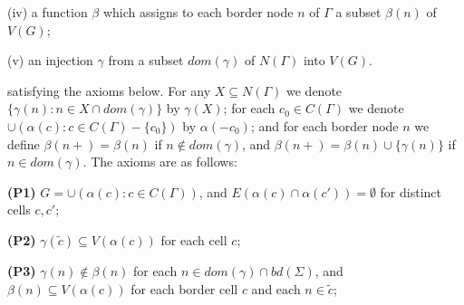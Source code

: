 \hspace*{12pt}(iv) a function $\beta$ which assigns to each border node $n$ of $\Gamma$ a subset $\beta(n)$ of $V(G)$;

\hspace*{12pt}(v) an injection $\gamma$ from a subset $dom(\gamma)$ of $N(\Gamma)$ into $V(G)$.

satisfying the axioms below. For any $X \subseteq N(\Gamma)$ we denote $\{\gamma(n) \colon n \in X \cap dom(\gamma)\}$ by $\gamma(X)$; for each $c_0 \in C(\Gamma)$ we denote $\cup (\alpha(c) \colon c \in C(\Gamma) - \{c_0\})$ by $\alpha(-c_0)$; and for each border node $n$ we define $\beta(n+) = \beta(n)$ if $n \notin dom(\gamma)$, and $\beta(n+) = \beta(n) \cup \{\gamma(n)\}$ if $n \in dom(\gamma)$. The axioms are as follows:

\textbf{(P1)} $G = \cup (\alpha(c) \colon c \in C(\Gamma))$, and $E(\alpha(c) \cap \alpha(c')) = \emptyset$ for distinct cells $c, c'$;

\textbf{(P2)} $\gamma(\tilde{c}) \subseteq V(\alpha(c))$ for each cell $c$;

\textbf{(P3)} $\gamma(n) \notin \beta(n)$ for each $n \in dom(\gamma) \cap bd(\Sigma)$, and $\beta(n) \subseteq V(\alpha(c))$ for each border cell $c$ and each $n \in \tilde{c}$;
